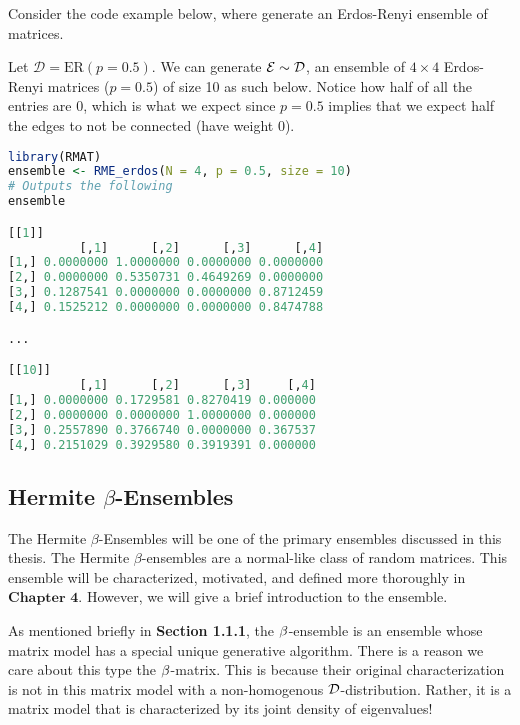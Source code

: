 Consider the code example below, where generate an Erdos-Renyi ensemble of matrices.

\begin{code}[Erdos-Renyi p = 0.5 Ensemble]
Let $\mathcal{D} = \text{ER}(p = 0.5)$. We can generate $\mathcal{E} \sim \mathcal{D}$, an ensemble of $4 \times 4$ Erdos-Renyi matrices ($p = 0.5$) of size 10 as such below.
Notice how half of all the entries are $0$, which is what we expect since $p = 0.5$ implies that we expect half the edges to not be connected (have weight 0).
\end{code}

\begin{lstlisting}[language=R]
library(RMAT)
ensemble <- RME_erdos(N = 4, p = 0.5, size = 10)
# Outputs the following
ensemble

[[1]]
          [,1]      [,2]      [,3]      [,4]
[1,] 0.0000000 1.0000000 0.0000000 0.0000000
[2,] 0.0000000 0.5350731 0.4649269 0.0000000
[3,] 0.1287541 0.0000000 0.0000000 0.8712459
[4,] 0.1525212 0.0000000 0.0000000 0.8474788

...

[[10]]
          [,1]      [,2]      [,3]     [,4]
[1,] 0.0000000 0.1729581 0.8270419 0.000000
[2,] 0.0000000 0.0000000 1.0000000 0.000000
[3,] 0.2557890 0.3766740 0.0000000 0.367537
[4,] 0.2151029 0.3929580 0.3919391 0.000000
\end{lstlisting}

\newpage
\subsection{Hermite $\beta$-Ensembles}

The Hermite $\beta$-Ensembles will be one of the primary ensembles discussed in this thesis. The Hermite $\beta$-ensembles are a normal-like class of random matrices.
This ensemble will be characterized, motivated, and defined more thoroughly in $\textbf{Chapter 4}$. However, we will give a brief introduction to the ensemble.

As mentioned briefly in \textbf{Section 1.1.1}, the $\beta$-ensemble is an ensemble whose matrix model has a special unique generative algorithm. There is a reason we
care about this type the $\beta$-matrix. This is because their original characterization is not in this matrix model with a non-homogenous $\mathcal{D}$-distribution. Rather, it is
a matrix model that is characterized by its joint density of eigenvalues!

